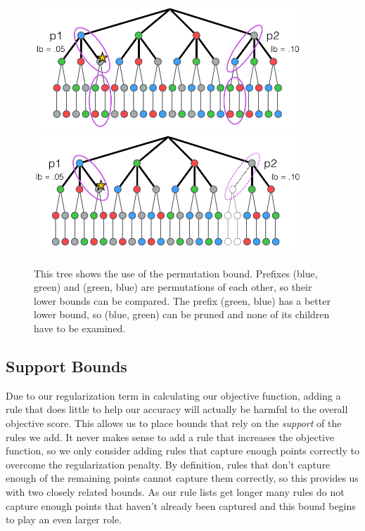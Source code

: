 \begin{figure}
\includegraphics[width=0.9\textwidth]{figs/branch-and-bound-permutations.png}
\includegraphics[width=0.9\textwidth]{figs/branch-and-bound-permutations-pruned.png}
\caption[Permutation bound]{This tree shows the use of the permutation bound. Prefixes (blue, green) and (green, blue) are permutations of each other, so their lower bounds can be compared. The prefix (green, blue) has a better lower bound, so (blue, green) can be pruned and none of its children have to be examined.
\label{fig:permutation-bound}}
\end{figure}

\subsection{Support Bounds}
Due to our regularization term in calculating our objective function, adding a rule that does little to help our accuracy will actually be harmful to the overall objective score.
This allows us to place bounds that rely on the \textit{support} of the rules we add.
It never makes sense to add a rule that increases the objective function, so we only consider adding rules that capture enough points correctly to overcome the regularization penalty.
By definition, rules that don't capture enough of the remaining points cannot capture them correctly, so this provides us with two closely related bounds.
As our rule lists get longer many rules do not capture enough points that haven't already been captured and this bound begins to play an even larger role.

